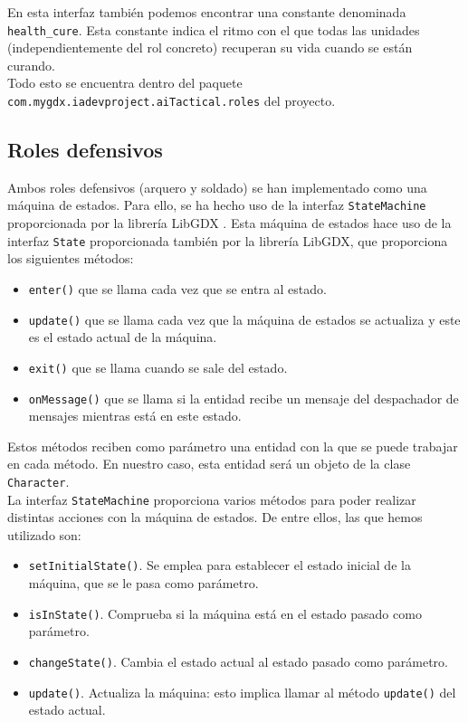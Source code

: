 En esta interfaz también podemos encontrar una constante denominada \texttt{health_cure}. Esta constante indica el ritmo con el que todas las unidades (independientemente del rol concreto) recuperan su vida cuando se están curando. \\

Todo esto se encuentra dentro del paquete \texttt{com.mygdx.iadevproject.aiTactical.roles} del proyecto.


\medskip
\subsection{Roles defensivos}
Ambos roles defensivos (arquero y soldado) se han implementado como una máquina de estados. Para ello, se ha hecho uso de la interfaz \texttt{StateMachine} proporcionada por la librería LibGDX \cite{stateMachine}. Esta máquina de estados hace uso de la interfaz \texttt{State} proporcionada también por la librería LibGDX, que proporciona los siguientes métodos:
\begin{itemize}
  \item \texttt{enter()} que se llama cada vez que se entra al estado. 
  \item \texttt{update()} que se llama cada vez que la máquina de estados se actualiza y este es el estado actual de la máquina.
  \item \texttt{exit()} que se llama cuando se sale del estado.
  \item \texttt{onMessage()} que se llama si la entidad recibe un mensaje del despachador de mensajes mientras está en este estado. 
\end{itemize}

Estos métodos reciben como parámetro una entidad con la que se puede trabajar en cada método. En nuestro caso, esta entidad será un objeto de la clase \texttt{Character}. \\

La interfaz \texttt{StateMachine} proporciona varios métodos para poder realizar distintas acciones con la máquina de estados. De entre ellos, las que hemos utilizado son:
\begin{itemize}
 \item \texttt{setInitialState()}. Se emplea para establecer el estado inicial de la máquina, que se le pasa como parámetro.
 \item \texttt{isInState()}. Comprueba si la máquina está en el estado pasado como parámetro.
 \item \texttt{changeState()}. Cambia el estado actual al estado pasado como parámetro.
 \item \texttt{update()}. Actualiza la máquina: esto implica llamar al método \texttt{update()} del estado actual. 
\end{itemize}

